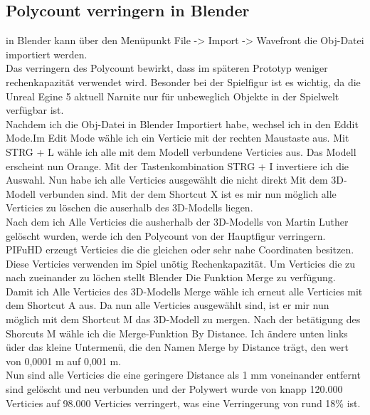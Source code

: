 \subsection{Polycount verringern in Blender}
in Blender kann über den Menüpunkt File -> Import -> Wavefront die Obj-Datei importiert werden. 
\\
Das verringern des Polycount bewirkt, dass im späteren Prototyp weniger rechenkapazität verwendet wird. Besonder bei der Spielfigur ist es wichtig, da die Unreal Egine 5 aktuell Narnite nur für unbeweglich Objekte in der Spielwelt verfügbar ist.
\\
Nachdem ich die Obj-Datei in Blender Importiert habe, wechsel ich in den Eddit Mode.Im Edit Mode wähle ich ein Verticie mit der rechten Maustaste aus. Mit STRG + L wähle ich alle mit dem Modell verbundene Verticies aus. Das Modell erscheint nun Orange. Mit der Tastenkombination STRG + I invertiere ich die Auswahl. Nun habe ich alle Verticies ausgewählt die nicht direkt Mit dem 3D-Modell verbunden sind. Mit der dem Shortcut X ist es mir nun möglich alle Verticies zu löschen die auserhalb des 3D-Modells liegen.
\\
Nach dem ich Alle Verticies die ausherhalb der 3D-Modells von Martin Luther gelöscht wurden, werde ich den Polycount von der Hauptfigur verringern. PIFuHD erzeugt Verticies die die gleichen oder sehr nahe Coordinaten besitzen. Diese Verticies verwenden im Spiel unötig Rechenkapazität. Um Verticies die zu nach zueinander zu löchen stellt Blender Die Funktion Merge zu verfügung.
\\
Damit ich Alle Verticies des 3D-Modells Merge wähle ich erneut alle Verticies mit dem Shortcut A aus. Da nun alle Verticies ausgewählt sind, ist er mir nun möglich mit dem Shortcut M das 3D-Modell zu mergen. Nach der betätigung des Shorcuts M wähle ich die Merge-Funktion By Distance. Ich ändere unten links üder das kleine Untermenü, die den Namen Merge by Distance trägt, den wert von 0,0001 m auf 0,001 m.
\\
Nun sind alle Verticies die eine geringere Distance als 1 mm voneinander entfernt sind gelöscht und neu verbunden und der Polywert wurde von knapp 120.000 Verticies auf 98.000 Verticies verringert, was eine Verringerung von rund 18\% ist.
\\
